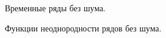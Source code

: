 \documentclass[specialist, substylefile = spbu.rtx,
			   subf, href, 12pt]{disser}
\begin{document}
\newpage
\begin{figure}[!hhh]
	\caption{Временные ряды без шума.}
	\label{pic:TimeSeriesWithoutNoise}
\end{figure}

\newpage
\begin{figure}[!hhh]
	\caption{Функции неоднородности рядов без шума.}
	\label{pic:HeterFuncsWithoutNoise}
\end{figure}
\end{document}
